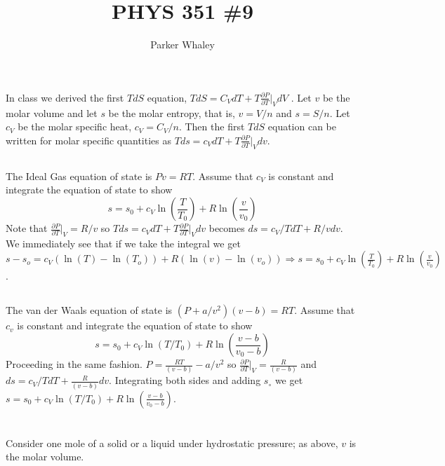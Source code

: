 \documentclass[10pt,a4paper]{article}
\author{Parker Whaley}
\title{PHYS 351 \#9}
\begin{document}
\maketitle
\section{}
In class we derived the first $T dS$ equation, $T dS = C_V dT + T\frac{\partial P}{\partial T}|_V dV$ . Let $v$ be the molar volume and let $s$ be the molar entropy, that is, $v = V /n$ and $s = S/n$. Let $c_V$ be the molar specific heat, $c_V = C_V /n$. Then the first $T dS$ equation can be written for molar specific quantities as $T ds = c_V dT + T \frac{\partial P}{\partial T}|_V dv$.
\subsection{}
The Ideal Gas equation of state is $P v = RT$. Assume that $c_V$ is constant and integrate the equation of state to show 
$$s = s_0 + c_V \ln(\frac{T}{T_0})+ R \ln(\frac{v}{v_0})$$
Note that $\frac{\partial P}{\partial T}|_V=R/v$ so $T ds = c_V dT + T \frac{\partial P}{\partial T}|_V dv$ becomes $ ds = c_V/T dT +  R/v dv$.  We immediately see that if we take the integral we get $s-s_o=c_V (\ln(T)-\ln(T_o))+R(\ln(v)-\ln(v_o))\Rightarrow s = s_0 + c_V \ln(\frac{T}{T_0})+ R \ln(\frac{v}{v_0})$.
\subsection{}
The van der Waals equation of state is $(P +a/v^2 )(v - b) = RT$. Assume that $c_v$ is constant and integrate the equation of state to show 
$$s = s_0 + c_V \ln(T/T_0)+ R \ln(\frac{v - b}{v_0 - b})$$
Proceeding in the same fashion.  $P= \frac{RT}{(v - b)}-a/v^2 $ so $\frac{\partial P}{\partial T}|_V=\frac{R}{(v - b)}$ and $ ds = c_V/T dT +  \frac{R}{(v - b)} dv$.  Integrating both sides and adding $s_\circ$ we get $s = s_0 + c_V \ln(T/T_0)+ R \ln(\frac{v - b}{v_0 - b})$.
\section{}
Consider one mole of a solid or a liquid under hydrostatic pressure; as above, $v$ is the molar volume.
\end{document}
